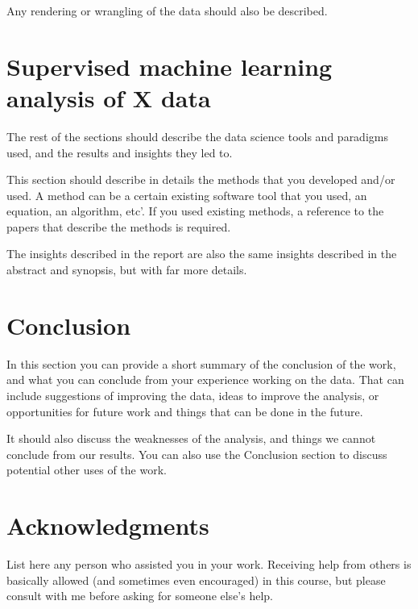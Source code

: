 \documentclass[article,pdftex,10pt,a4paper,twocolumn]{article}
\begin{document}
Any rendering or wrangling of the data should also be described.
 
 



\section{Supervised machine learning analysis of X data}
\label{method}

The rest of the sections should describe the data science tools and paradigms used, and the results and insights they led to. 

This section should describe in details the methods that you developed and/or used. A method can be a certain existing software tool that you used, an equation, an algorithm, etc’.  If you used existing methods, a reference to the papers that describe the methods is required.

The insights described in the report are also the same insights described in the abstract and synopsis, but with far more details.



\section{Conclusion}
\label{conclusion}

In this section you can provide a short summary of the conclusion of the work, and what you can conclude from your experience working on the data. That can include suggestions of improving the data, ideas to improve the analysis, or opportunities for future work and things that can be done in the future.


It should also discuss the weaknesses of the analysis, and things we cannot conclude from our results. You can also use the Conclusion section to discuss potential other uses of the work.





\section*{Acknowledgments}

List here any person who assisted you in your work. Receiving help from others is basically allowed (and sometimes even encouraged) in this course, but please consult with me before asking for someone else’s help.






\end{document}
